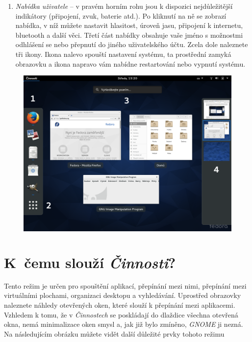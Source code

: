\begin{enumerate}
\item\emph{Nabídka uživatele} -- v pravém horním rohu jsou k dispozici nejdůležitější indikátory (připojení, zvuk, baterie atd.). Po kliknutí na ně se zobrazí nabídka, v níž můžete nastavit hlasitost, úroveň jasu, připojení k internetu, bluetooth a další věci. Třetí část nabídky obsahuje vaše jméno s možnostmi odhlášení se nebo přepnutí do jiného uživatelského účtu. Zcela dole naleznete tři ikony. Ikona nalevo spouští nastavení systému, ta prostřední zamyká obrazovku a ikona napravo vám nabídne restartování nebo vypnutí systému.
\end{enumerate}

\begin{figure}[t]
\begin{center}
\includegraphics[width=\textwidth]{img/shell-b}
 \label{fig:shell-b}
\end{center}
\end{figure}

\section*{K~čemu slouží \emph{Činnosti}?}
Tento režim je určen pro spouštění aplikací, přepínání mezi nimi, přepínání mezi virtuálními plochami, organizaci desktopu a vyhledávání. Uprostřed obrazovky naleznete náhledy otevřených oken, které slouží k přepínání mezi aplikacemi. Vzhledem k tomu, že v \emph{Činnostech} se poskládají do dlaždice všechna otevřená okna, nemá minimalizace oken smysl a, jak již bylo zmíněno, \emph{GNOME} ji nezná. Na následujícím obrázku můžete vidět další důležité prvky tohoto režimu

